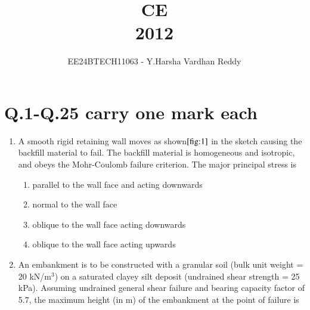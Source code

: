 \documentclass[journal]{IEEEtran}
\numberwithin{equation}{enumi}
\numberwithin{figure}{enumi}
\begin{document}

\vspace{3cm}

\title{CE\\2012}
\author{EE24BTECH11063 - Y.Harsha Vardhan Reddy}
\maketitle

\bigskip

\section*{Q.1-Q.25 carry one mark each}
\begin{enumerate}

\item A smooth rigid retaining wall moves as shown$\ref{fig:1}$ in the sketch causing the backfill material to fail. The backfill material is homogeneous and isotropic, and obeys the Mohr-Coulomb failure criterion. The major principal stress is
\begin{figure}[H]
    \centering
    
    \caption{}
    \label{fig:1}
\end{figure}
\begin{enumerate}
    \item parallel to the wall face and acting downwards
    \item normal to the wall face
    \item oblique to the wall face acting downwards
    \item oblique to the wall face acting upwards
\end{enumerate}
\item An embankment is to be constructed with a granular soil (bulk unit weight = 20 kN/m$^3$) on a saturated clayey silt deposit (undrained shear strength = 25 kPa). Assuming undrained general shear failure and bearing capacity factor of 5.7, the maximum height (in m) of the embankment at the point of failure is

\begin{enumerate}
\end{enumerate}


\end{enumerate}
\end{document}
